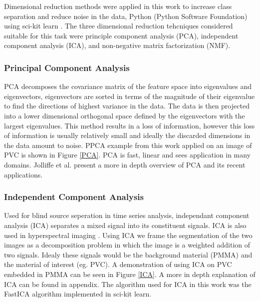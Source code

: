 \documentclass[a4paper,11pt]{article}
\begin{document}
Dimensional reduction methods were applied in this work to increase class separation and reduce noise in the data, Python (Python Software Foundation) using sci-kit learn \cite{Pedregosa2011Scikit-learn:Python}. The three dimensional reduction tehcniques considered suitable for this task were principle component analysis (PCA), independent component analysis (ICA), and non-negative matrix factorization (NMF).

\subsubsection{Principal Component Analysis}

PCA decomposes the covariance matrix of the feature space into eigenvalues and eigenvectors, eigenvectors are sorted in terms of the magnitude of their eigenvalue to find the directions of highest variance in the data. The data is then projected into a lower dimensional orthogonal space defined by the eigenvectors with the largest eigenvalues. This method results in a loss of information, however this loss of information is usually relatively small and ideally the discarded dimensions in the data amount to noise. PPCA example from this work applied on an image of PVC is shown in Figure \ref{PCA}. PCA is fast, linear and sees application in many domains. Jolliffe et al. \cite{Jolliffe2016PrincipalDevelopments.} present a more in depth overview of PCA and its recent applications.

  
  
  

\subsubsection{Independent Component Analysis}

Used for blind source seperation in time series analysis, independant component analysis (ICA) separates a mixed signal into its constituent signals. ICA is also used in hyperspectral imaging \cite{Villa2009OnAnalysis}. Using ICA we frame the segmentation of the two images as a decomposition problem in which the image is a weighted addition of two signals. Idealy these signals would be the background material (PMMA) and the material of interest (eg. PVC). A demonstration of using ICA on 
PVC embedded in PMMA can be seen in Figure \ref{ICA}. A more in depth explanation of ICA can be found in appendix. The algorithm used for ICA in this work was the FastICA \cite{Hyvarinen2000IndependentApplications} algorithm implemented in sci-kit learn.
\end{document}
